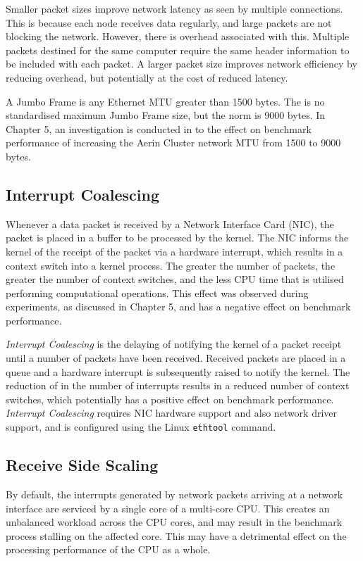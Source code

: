 Smaller packet sizes improve network latency as seen by multiple connections. This is because each node receives data regularly, and large packets are not blocking the network. However, there is overhead associated with this. Multiple packets destined for the same computer require the same header information to be included with each packet. A larger packet size improves network efficiency by reducing overhead, but potentially at the cost of reduced latency.

A Jumbo Frame is any Ethernet MTU greater than 1500 bytes. The is no standardised maximum Jumbo Frame size, but the norm is 9000 bytes. In Chapter 5, an investigation is conducted in to the effect on benchmark performance of increasing the Aerin Cluster network MTU from 1500 to 9000 bytes.


\subsection{Interrupt Coalescing}

Whenever a data packet is received by a Network Interface Card (NIC), the packet is placed in a buffer to be processed by the kernel. The NIC informs the kernel of the receipt of the packet via a hardware interrupt, which results in a context switch into a kernel process. The greater the number of packets, the greater the number of context switches, and the less CPU time that is utilised performing computational operations. This effect was observed during experiments, as discussed in Chapter 5, and has a negative effect on benchmark performance.

\emph{Interrupt Coalescing} is the delaying of notifying the kernel of a packet receipt until a number of packets have been received. Received packets are placed in a queue and a hardware interrupt is subsequently raised to notify the kernel. The reduction of in the number of interrupts results in a reduced number of context switches, which potentially has a positive effect on benchmark performance. \emph{Interrupt Coalescing} requires NIC hardware support and also network driver support, and is configured using the Linux \verb|ethtool| command.


\subsection{Receive Side Scaling}

By default, the interrupts generated by network packets arriving at a network interface are serviced by a single core of a multi-core CPU. This creates an unbalanced workload across the CPU cores, and may result in the benchmark process stalling on the affected core. This may have a detrimental effect on the processing performance of the CPU as a whole.

